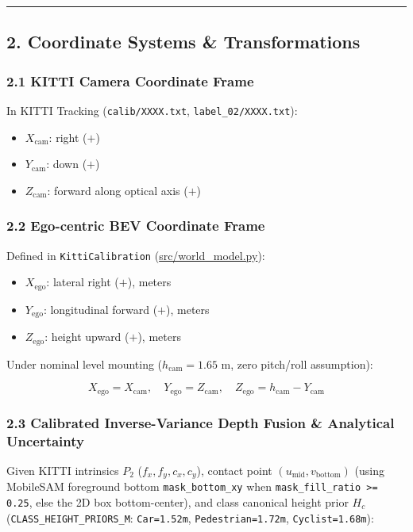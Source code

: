 \documentclass[10.5pt,a4paper]{article}
\begin{document}
\par\noindent\rule{\textwidth}{0.4pt}\par\medskip

\subsection{2. Coordinate Systems \& Transformations}

\subsubsection{2.1 KITTI Camera Coordinate Frame}
In KITTI Tracking (\texttt{calib/\allowbreak{}XXXX.\allowbreak{}txt}, \texttt{label\_\allowbreak{}02/\allowbreak{}XXXX.\allowbreak{}txt}):

\begin{itemize}[leftmargin=1.5em,itemsep=2pt]
\item $X_{\text{cam}}$: right ($+$)
\item $Y_{\text{cam}}$: down ($+$)
\item $Z_{\text{cam}}$: forward along optical axis ($+$)
\end{itemize}

\subsubsection{2.2 Ego-centric BEV Coordinate Frame}
Defined in \texttt{KittiCalibration} (\href{https://github.com/Heisnotanimposter/Totalcare\_autonomous\_driving\_Yolov5/blob/main/src/world\_model.py}{src/world\_model.py}):

\begin{itemize}[leftmargin=1.5em,itemsep=2pt]
\item $X_{\text{ego}}$: lateral right ($+$), meters
\item $Y_{\text{ego}}$: longitudinal forward ($+$), meters
\item $Z_{\text{ego}}$: height upward ($+$), meters
\end{itemize}

Under nominal level mounting ($h_{\text{cam}} = 1.65\text{ m}$, zero pitch/roll assumption):

\[X_{\text{ego}} = X_{\text{cam}}, \quad Y_{\text{ego}} = Z_{\text{cam}}, \quad Z_{\text{ego}} = h_{\text{cam}} - Y_{\text{cam}}\]

\subsubsection{2.3 Calibrated Inverse-Variance Depth Fusion \& Analytical Uncertainty}
Given KITTI intrinsics $P_2$ ($f_x, f_y, c_x, c_y$), contact point $(u_{\text{mid}}, v_{\text{bottom}})$ (using MobileSAM foreground bottom \texttt{mask\_\allowbreak{}bottom\_\allowbreak{}xy} when \texttt{mask\_\allowbreak{}fill\_\allowbreak{}ratio >= 0.\allowbreak{}25}, else the 2D box bottom-center), and class canonical height prior $H_c$ (\texttt{CLASS\_\allowbreak{}HEIGHT\_\allowbreak{}PRIORS\_\allowbreak{}M}: \texttt{Car=1.\allowbreak{}52m}, \texttt{Pedestrian=1.\allowbreak{}72m}, \texttt{Cyclist=1.\allowbreak{}68m}):
\end{document}
